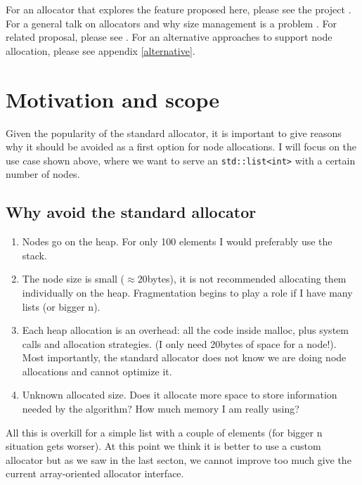 \documentclass[11pt]{article}
\begin{document}
For an allocator that explores the feature proposed here, please see the
project \cite{rtcpp}. For a general talk on allocators and why size management
is a problem \cite{alexandrescu}. For related proposal, please see
\cite{prop1}.  For an alternative approaches to support node allocation, please
see appendix \ref{alternative}.

\section{Motivation and scope}

Given the popularity of the standard allocator, it is important to give reasons
why it should be avoided as a first option for node allocations. I will focus
on the use case shown above, where we want to serve an
\texttt{std::list<int>} with a certain number of nodes.

\subsection{Why avoid the standard allocator}

\begin{enumerate}

\item Nodes go on the heap. For only 100 elements I would preferably
use the stack.

\item The node size is small ($\approx 20$bytes), it is not recommended
allocating them individually on the heap. Fragmentation begins to play a role
if I have many lists (or bigger n).

\item  Each heap allocation is an overhead: all the code inside malloc, plus
system calls and allocation strategies. (I only need 20bytes of space for a
node!). Most importantly, the standard allocator does not
know we are doing node allocations and cannot optimize it.

\item Unknown allocated size. Does it allocate more space to store information
needed by the algorithm? How much memory I am really using?

\end{enumerate}

All this is overkill for a simple list with a couple of elements
(for bigger n situation gets worser). At this point we think it is
better to use a custom allocator but as we saw in the last secton,
we cannot improve too much give the current array-oriented allocator
interface.
\end{document}
